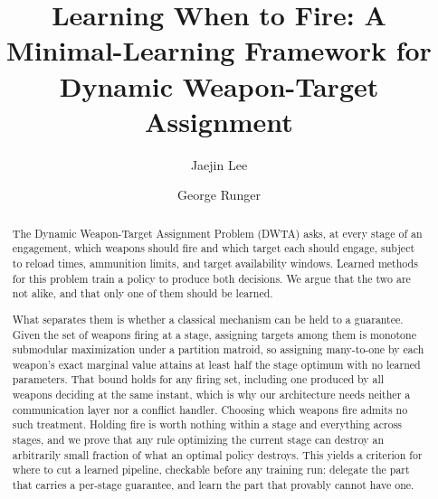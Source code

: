 \documentclass[preprint,12pt]{elsarticle}
\begin{document}
\begin{frontmatter}

\title{Learning When to Fire: A Minimal-Learning Framework for\\
Dynamic Weapon-Target Assignment}

\author[intel]{Jaejin Lee}

\author[asu]{George Runger}

\address[intel]{Intel Corporation, Chandler, AZ 85226, USA}
\address[asu]{School of Computing and Augmented Intelligence, Arizona State University, Tempe, AZ 85281, USA}

\begin{abstract}
The Dynamic Weapon-Target Assignment Problem (DWTA) asks, at every stage of an
engagement, which weapons should fire and which target each should engage,
subject to reload times, ammunition limits, and target availability windows.
Learned methods for this problem train a policy to produce both decisions. We
argue that the two are not alike, and that only one of them should be learned.

What separates them is whether a classical mechanism can be held to a
guarantee. Given the set of weapons firing at a stage, assigning targets among
them is monotone submodular maximization under a partition matroid, so
assigning many-to-one by each weapon's exact marginal value attains at least
half the stage optimum with no learned parameters. That bound holds for any
firing set, including one produced by all weapons deciding at the same
instant, which is why our architecture needs neither a communication layer nor
a conflict handler. Choosing which weapons fire admits no such treatment.
Holding fire is worth nothing within a stage and everything across stages, and
we prove that any rule optimizing the current stage can destroy an arbitrarily
small fraction of what an optimal policy destroys. This yields a criterion for
where to cut a learned pipeline, checkable before any training run: delegate
the part that carries a per-stage guarantee, and learn the part that provably
cannot have one.


\end{abstract}
\end{frontmatter}
\end{document}
